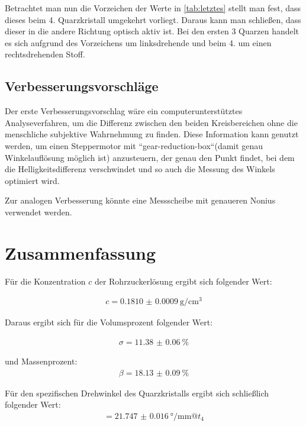 \documentclass[11pt,ngerman]{scrartcl}
\begin{document}
Betrachtet man nun die Vorzeichen der Werte in \autoref{tab:letztes} stellt man
fest, dass dieses beim 4. Quarzkristall umgekehrt vorliegt. Daraus kann man
schließen, dass dieser in die andere Richtung optisch aktiv ist. Bei den ersten
3 Quarzen handelt es sich aufgrund des Vorzeichens um linksdrehende und beim 4.
um einen rechtsdrehenden Stoff.

\subsection{Verbesserungsvorschläge}

Der erste Verbesserungsvorschlag wäre ein computerunterstütztes
Analyseverfahren, um die Differenz zwischen den beiden Kreisbereichen ohne die
menschliche subjektive Wahrnehmung zu finden. Diese Information kann genutzt
werden, um einen Steppermotor mit ``gear-reduction-box``(damit genau
Winkelauflösung möglich ist) anzusteuern, der genau den Punkt findet, bei dem
die Helligkeitsdifferenz verschwindet und so auch die Messung des Winkels
optimiert wird.

Zur analogen Verbesserung könnte eine Messscheibe mit genaueren Nonius
verwendet werden.


\newpage

\section{Zusammenfassung}

Für die Konzentration $c$ der Rohrzuckerlösung ergibt sich folgender Wert:

\begin{align*}
	c = \SI{0.1810(9)}{\g\per\cm\cubed}
\end{align*}

Daraus ergibt sich für die Volumsprozent folgender Wert:

\begin{align*}
	\sigma = \SI{11.38(6)}{\percent}
\end{align*}

und Massenprozent:
\begin{align*}
	\beta = \SI{18.13(9)}{\percent}
\end{align*}

Für den spezifischen Drehwinkel des Quarzkristalls ergibt sich schließlich
folgender Wert:
\begin{align*}
	[\alpha] = \SI{21.747(16)}{\degree\per\mm} @t_4
\end{align*}
\end{document}
